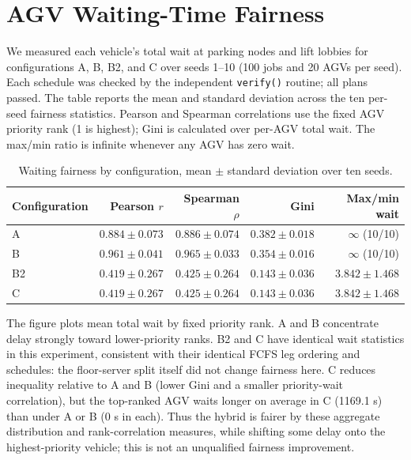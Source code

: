 \documentclass[11pt]{article}
\begin{document}
\section{AGV Waiting-Time Fairness}
\label{sec:priority-wait-fairness}

We measured each vehicle's total wait at parking nodes and lift lobbies for
configurations A, B, B2, and C over seeds 1--10 (100 jobs and 20 AGVs per
seed). Each schedule was checked by the independent \texttt{verify()} routine;
all plans passed. The table reports the mean and standard deviation across the
ten per-seed fairness statistics. Pearson and Spearman correlations use the
fixed AGV priority rank (1 is highest); Gini is calculated over per-AGV total
wait. The max/min ratio is infinite whenever any AGV has zero wait.

\begin{table}[htbp]
\centering
\caption{Waiting fairness by configuration, mean $\pm$ standard deviation over ten seeds.}
\label{tab:fairness-configs}
\begin{tabular}{lrrrr}
\toprule
Configuration & Pearson $r$ & Spearman $\rho$ & Gini & Max/min wait \\
\midrule
A   & $0.884\pm0.073$ & $0.886\pm0.074$ & $0.382\pm0.018$ & $\infty$ (10/10) \\
B   & $0.961\pm0.041$ & $0.965\pm0.033$ & $0.354\pm0.016$ & $\infty$ (10/10) \\
B2  & $0.419\pm0.267$ & $0.425\pm0.264$ & $0.143\pm0.036$ & $3.842\pm1.468$ \\
C   & $0.419\pm0.267$ & $0.425\pm0.264$ & $0.143\pm0.036$ & $3.842\pm1.468$ \\
\bottomrule
\end{tabular}
\end{table}

The figure plots mean total wait by fixed priority rank. A and B concentrate
delay strongly toward lower-priority ranks. B2 and C have identical wait
statistics in this experiment, consistent with their identical FCFS leg
ordering and schedules: the floor-server split itself did not change fairness
here. C reduces inequality relative to A and B (lower Gini and a smaller
priority-wait correlation), but the top-ranked AGV waits longer on average in
C (1169.1 s) than under A or B (0 s in each). Thus the hybrid is fairer by
these aggregate distribution and rank-correlation measures, while shifting
some delay onto the highest-priority vehicle; this is not an unqualified
fairness improvement.
\end{document}
